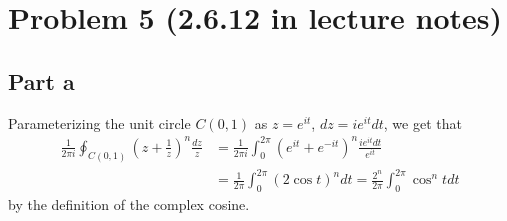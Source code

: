 \documentclass{article}
\begin{document}
\section{Problem 5 (2.6.12 in lecture notes)}
\subsection{Part a}
Parameterizing the unit circle $C(0,1)$ as $z=e^{it}$, $dz=ie^{it}dt$, we get that 
\begin{align*}
\frac{1}{2\pi i}\oint_{C(0,1)}\left(z+\frac{1}{z}\right)^n\frac{dz}{z}&=\frac{1}{2\pi i}\int_0^{2\pi}(e^{it}+e^{-it})^n\frac{ie^{it}dt}{e^{it}}\\&=
\frac{1}{2\pi}\int_0^{2\pi}\left(2\cos t\right)^ndt=\frac{2^n}{2\pi }\int_0^{2\pi}\cos^nt dt
\end{align*}
by the definition of the complex cosine.
\end{document}
